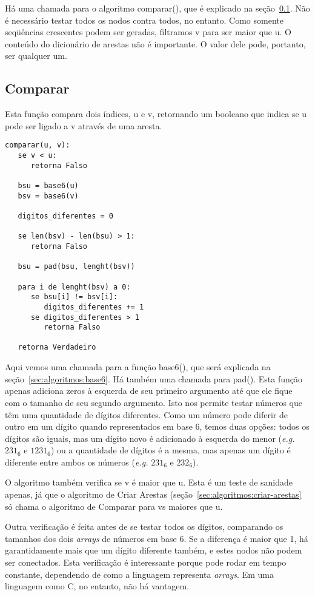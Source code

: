 \documentclass[12pt]{article}
\begin{document}
Há uma chamada para o algoritmo {\sf comparar()}, que é explicado na se\c{c}ão~\ref{sec:algoritmos:comparar}.
Não é necessário testar todos os nodos contra todos, no entanto. Como somente seqüências crescentes podem ser geradas, filtramos {\sf v} para ser maior que {\sf u}.
O conteúdo do dicionário de arestas não é importante. O valor dele pode, portanto, ser qualquer um.

\subsection{Comparar}\label{sec:algoritmos:comparar}
Esta fun\c{c}ão compara dois índices, {\sf u} e {\sf v}, retornando um booleano que indica se {\sf u} pode ser ligado a {\sf v} através de uma aresta.
\begin{lstlisting}
comparar(u, v):
   se v < u:
      retorna Falso

   bsu = base6(u)
   bsv = base6(v)

   digitos_diferentes = 0

   se len(bsv) - len(bsu) > 1:
      retorna Falso

   bsu = pad(bsu, lenght(bsv))

   para i de lenght(bsv) a 0:
      se bsu[i] != bsv[i]:
         digitos_diferentes += 1
      se digitos_diferentes > 1
         retorna Falso

   retorna Verdadeiro
\end{lstlisting}

Aqui vemos uma chamada para a fun\c{c}ão {\sf base6()}, que será explicada na se\c{c}ão~\ref{sec:algoritmos:base6}.
Há também uma chamada para {\sf pad()}. Esta fun\c{c}ão apenas adiciona zeros à esquerda de seu primeiro argumento até que ele fique com o tamanho de seu segundo argumento. Isto nos permite testar números que têm uma quantidade de dígitos diferentes.
Como um número pode diferir de outro em um dígito quando representados em base 6, temos duas op\c{c}ões: todos os dígitos são iguais, mas um dígito novo é adicionado à esquerda do menor (\textit{e.g.} $231_6$ e $1231_6$) ou a quantidade de dígitos é a mesma, mas apenas um dígito é diferente entre ambos os números (\textit{e.g.} $231_6$ e $232_6$).

O algoritmo também verifica se {\sf v} é maior que {\sf u}. Esta é um teste de sanidade apenas, já que o algoritmo de Criar Arestas (se\c{c}ão~\ref{sec:algoritmos:criar-arestas} só chama o algoritmo de Comparar para {\sf v}s maiores que {\sf u}.

Outra verifica\c{c}ão é feita antes de se testar todos os dígitos, comparando os tamanhos dos dois \textit{arrays} de números em base 6. Se a diferen\c{c}a é maior que 1, há garantidamente mais que um dígito diferente também, e estes nodos não podem ser conectados. Esta verifica\c{c}ão é interessante porque pode rodar em tempo constante, dependendo de como a linguagem representa \textit{arrays}. Em uma linguagem como C, no entanto, não há vantagem.
\end{document}
